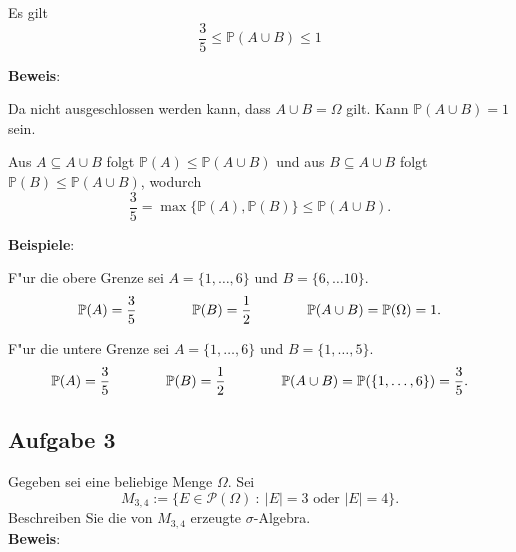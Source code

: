 \documentclass[11pt,a4paper,ngerman]{article}
\newcommand{\set}[1]{ \{ #1 \}}
\newcommand{\Prob}{\mathbb{P}}
\newcommand{\Pot}{\mathcal{P}}
\newcommand{\abs}[1]{ |#1|}
\begin{document}
\begin{enumerate}[(i)]
    Es gilt \[
      \dfrac{3}{5} \le \Prob(A \cup B) \le 1
    \]

    \textbf{Beweis}:

    Da nicht ausgeschlossen werden kann, dass $A \cup B = \Omega$ gilt. Kann
    $\Prob(A\cup B) = 1$ sein.

    Aus $A \subseteq A\cup B$ folgt $\Prob(A) \le \Prob(A\cup B)$ und aus
    $B \subseteq A\cup B$ folgt $\Prob(B) \le \Prob(A\cup B)$, wodurch \[
      \dfrac{3}{5} = \max\set{\Prob(A), \Prob(B)} \le \Prob(A\cup B).
    \]

    \textbf{Beispiele}:

    F"ur die obere Grenze sei $A = \set{1,\ldots,6}$ und
    $B = \set{6, \ldots 10}$. \[
      \Prob(A) = \dfrac{3}{5} \\ \qquad\qquad
      \Prob(B) = \dfrac{1}{2} \\ \qquad\qquad
      \Prob(A\cup B) = \Prob(\Omega) = 1.
    \]

    F"ur die untere Grenze sei $A = \set{1,\ldots,6}$ und
    $B = \set{1,\ldots, 5}$. \[
      \Prob(A) = \dfrac{3}{5} \\ \qquad\qquad
      \Prob(B) = \dfrac{1}{2} \\ \qquad\qquad
      \Prob(A\cup B) = \Prob(\set{1,\ldots,6}) = \dfrac{3}{5}.
    \]
\end{enumerate}

\subsection*{Aufgabe 3}

\newcommand{\SetM}{M_{3,4}}

Gegeben sei eine beliebige Menge $\Omega$. Sei \[
  \SetM := \set{E \in \Pot(\Omega)\ :\ \abs{E} = 3 \mbox{ oder } \abs{E} = 4}.
\]
Beschreiben Sie die von $\SetM$ erzeugte $\sigma$-Algebra.\\

\textbf{Beweis}:
\end{document}
